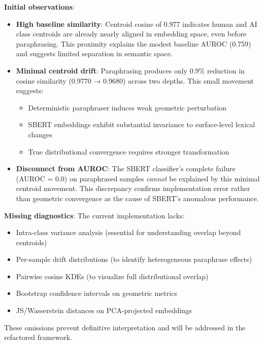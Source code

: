 \documentclass[conference]{IEEEtran}
\begin{document}
\textbf{Initial observations}:

\begin{itemize}
    \item \textbf{High baseline similarity}: Centroid cosine of 0.977 indicates human and AI class centroids are already nearly aligned in embedding space, even before paraphrasing. This proximity explains the modest baseline AUROC (0.759) and suggests limited separation in semantic space.
    
    \item \textbf{Minimal centroid drift}: Paraphrasing produces only 0.9\% reduction in cosine similarity (0.9770 → 0.9680) across two depths. This small movement suggests:
    \begin{itemize}
        \item Deterministic paraphraser induces weak geometric perturbation
        \item SBERT embeddings exhibit substantial invariance to surface-level lexical changes
        \item True distributional convergence requires stronger transformation
    \end{itemize}
    
    \item \textbf{Disconnect from AUROC}: The SBERT classifier's complete failure (AUROC = 0.0) on paraphrased samples \emph{cannot} be explained by this minimal centroid movement. This discrepancy confirms implementation error rather than geometric convergence as the cause of SBERT's anomalous performance.
\end{itemize}

\textbf{Missing diagnostics}: The current implementation lacks:
\begin{itemize}
    \item Intra-class variance analysis (essential for understanding overlap beyond centroids)
    \item Per-sample drift distributions (to identify heterogeneous paraphrase effects)
    \item Pairwise cosine KDEs (to visualize full distributional overlap)
    \item Bootstrap confidence intervals on geometric metrics
    \item JS/Wasserstein distances on PCA-projected embeddings
\end{itemize}

These omissions prevent definitive interpretation and will be addressed in the refactored framework.
\end{document}
